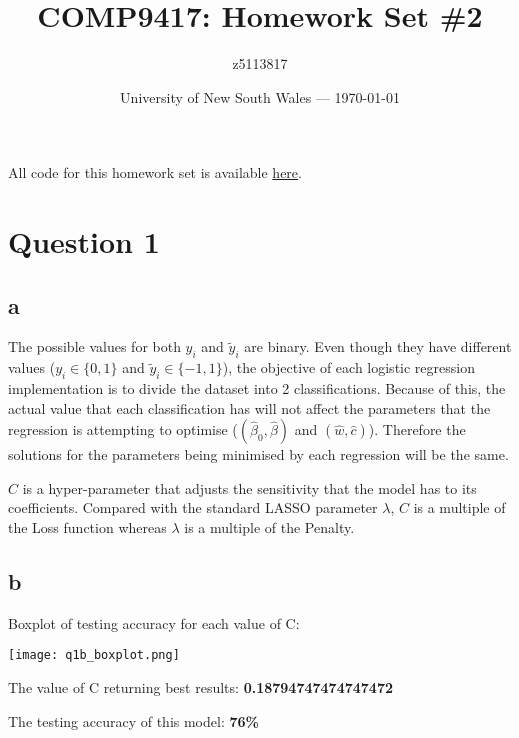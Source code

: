 \documentclass{article}
\title{COMP9417: Homework Set \#2} %
\author{z5113817} %
\date{University of New South Wales --- \today} %
\begin{document}
\maketitle %


All code for this homework set is available \href{https://github.com/william-coulter/COMP9417\_Homework\_2/tree/master}{here}.

\newpage

\section*{Question 1}

\subsection*{a}
The possible values for both \(y_{i}\) and \(\tilde{y}_{i}\) are binary. Even though they have different values
(\(y_{i}\in\{0,1\}\) and \(\tilde{y}_{i}\in\{-1,1\}\)), the objective of each logistic regression implementation
is to divide the dataset into 2 classifications. Because of this, the actual value that each classification has
will not affect the parameters that the regression is attempting to optimise (\((\hat{\beta}_{0}, \hat{\beta})\) and
\((\hat{w}, \hat{c})\)). Therefore the solutions for the parameters being minimised by each regression will be the
same.

\(C\) is a hyper-parameter that adjusts the sensitivity that the model has to its coefficients. Compared with the
standard LASSO parameter \(\lambda\), \(C\) is a multiple of the Loss function whereas \(\lambda\) is a multiple
of the Penalty.

\subsection*{b}
\label{1b}

Boxplot of testing accuracy for each value of C:

\texttt{[image: q1b\_boxplot.png]}

The value of C returning best results: \textbf{0.18794747474747472}

The testing accuracy of this model: \textbf{76\%}

\newpage
\end{document}
